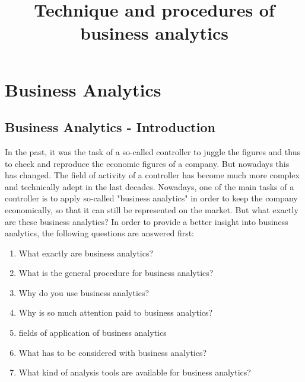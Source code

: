 \documentclass[12pt,twocolumn,twoside]{conference}   %
\title{Technique and procedures of business analytics}
\author{}
\begin{document}

\section{Business Analytics}
\subsection{Business Analytics - Introduction}
In the past, it was the task of a so-called controller to juggle the figures and thus to check and reproduce the economic figures of a company. But nowadays this has changed. The field of activity of a controller has become much more complex and technically adept in the last decades. Nowadays, one of the main tasks of a controller is to apply so-called "business analytics" in order to keep the company economically, so that it can still be represented on the market. But what exactly are these business analytics?
In order to provide a better insight into business analytics, the following questions are answered first: 

\begin{enumerate}
\item What exactly are business analytics?
\item What is the general procedure for business analytics?
\item Why do you use business analytics?
\item Why is so much attention paid to business analytics?
\item fields of application of business analytics
\item What has to be considered with business analytics?
\item What kind of analysis tools are available for business analytics?
\end{enumerate}
\end{document}
